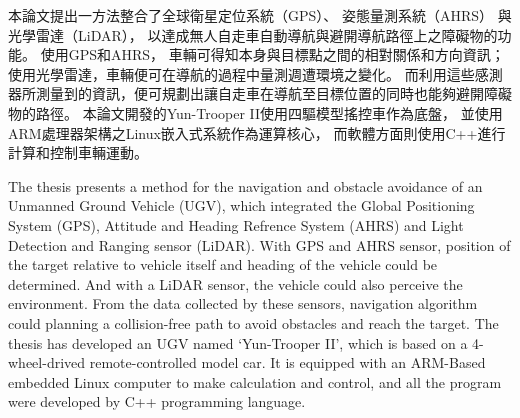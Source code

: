 \begin{abstractzh}
本論文提出一方法整合了全球衛星定位系統（GPS）、
姿態量測系統（AHRS）
與光學雷達（LiDAR），
以達成無人自走車自動導航與避開導航路徑上之障礙物的功能。
使用GPS和AHRS，
車輛可得知本身與目標點之間的相對關係和方向資訊；
使用光學雷達，車輛便可在導航的過程中量測週遭環境之變化。
而利用這些感測器所測量到的資訊，便可規劃出讓自走車在導航至目標位置的同時也能夠避開障礙物的路徑。
本論文開發的Yun-Trooper II使用四驅模型搖控車作為底盤，
並使用ARM處理器架構之Linux嵌入式系統作為運算核心，
而軟體方面則使用C++進行計算和控制車輛運動。


\end{abstractzh}

\begin{abstracten}
The thesis presents a method for the navigation and obstacle avoidance 
of an Unmanned Ground Vehicle (UGV), which integrated the
Global Positioning System (GPS), 
Attitude and Heading Refrence System (AHRS) and
Light Detection and Ranging sensor (LiDAR).
With GPS and AHRS sensor, position of the target relative to vehicle itself and heading of the vehicle could be determined.
And with a LiDAR sensor, the vehicle could also perceive the environment.
From the data collected by these sensors, navigation algorithm could planning a collision-free path to avoid obstacles and reach the target.
The thesis has developed an UGV named `Yun-Trooper \nolinebreak II', which is based on a 4-wheel-drived remote-controlled model car.
It is equipped with an ARM-Based embedded Linux computer to make calculation and control, and all the program were developed by C++ programming
language.


\end{abstracten}
